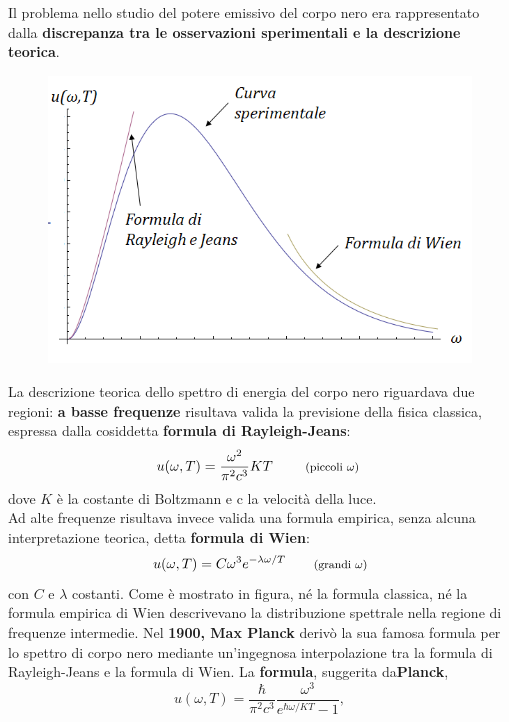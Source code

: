 Il problema nello studio del potere emissivo del corpo nero era rappresentato dalla \textbf{discrepanza tra le osservazioni sperimentali e la descrizione teorica}.\\
\begin{figure}[!htbp]
\begin{center}
\includegraphics[width=.7\textwidth]{immagini/cap_1/fig_1_2.png}
\end{center}
\end{figure}
La descrizione teorica dello spettro di energia del corpo nero riguardava due regioni: \textbf{a basse frequenze} risultava valida la previsione della fisica classica, espressa dalla cosiddetta \textbf{formula di Rayleigh-Jeans}:
\begin{equation}
u(\omega , T)= \frac{\omega ^2}{\pi ^2 c^3}KT \qquad \textrm{ \footnotesize{(piccoli $\omega$)} }
\end{equation}
dove $K$ è la costante di Boltzmann e c la velocità della luce.\\
Ad alte frequenze risultava invece valida una formula empirica, senza alcuna interpretazione teorica, detta \textbf{formula di Wien}:
\begin{equation}
u(\omega ,T)= C \omega ^3 e^{-\lambda \omega /T} \qquad \textrm{\footnotesize{(grandi $\omega$)}}
\end{equation}
con $C$ e $\lambda$ costanti. Come è mostrato in figura, né la formula classica, né  la formula empirica di Wien descrivevano la distribuzione spettrale nella regione di frequenze intermedie.
Nel \textbf{1900, Max Planck} derivò la sua famosa formula per lo spettro di corpo nero mediante un'ingegnosa interpolazione tra la formula di Rayleigh-Jeans e la formula di Wien. La \textbf{formula}, suggerita da\textbf{Planck},
\begin{equation}
u(\omega, T) = \frac{\hbar}{\pi ^2 c^3}\frac{\omega ^3}{e^{\hbar \omega / KT}-1},
\end{equation}
